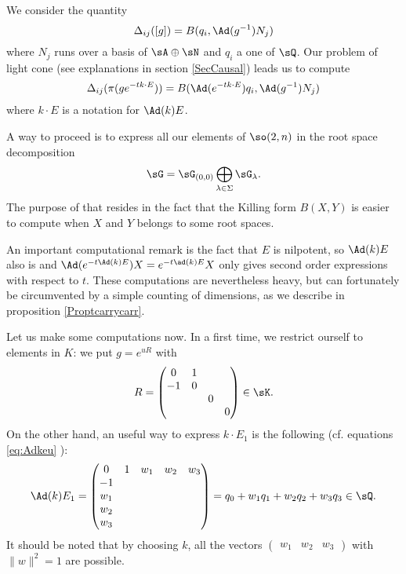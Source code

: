 We consider the quantity 
\[
\Delta_{ij}([g])=B(q_i,\Ad(g^{-1})N_j)
\]
where $N_j$ runs over a basis of $\sA\oplus\sN$ and $q_i$ a one of $\sQ$. Our problem of light cone (see explanations in section \ref{SecCausal}) leads us to compute
 \begin{equation} \label{eq:elemtr}
\Delta_{ij}(\pi(ge^{-tk\cdot E}))=B(\Ad(e^{-tk\cdot
E})q_i,\Ad(g^{-1})N_j)
\end{equation}
where $k\cdot E$ is a notation for $\Ad(k)E$.

A way to proceed is  to express all our elements of $\so(2,n)$ in the root space decomposition
\[
\sG=\sG_{(0,0)}\bigoplus_{\lambda\in\Sigma}\sG_{\lambda}.
\]
The purpose of that resides in the fact that the Killing form $B(X,Y)$ is easier to compute when $X$ and $Y$ belongs to some root spaces.

An important computational remark is the fact that $E$ is nilpotent, so $\Ad(k)E$ also is and $\Ad(e^{-t\Ad(k)E})X=e^{-t\ad(k)E}X$ only gives second order expressions with respect to $t$. These computations are nevertheless heavy, but can fortunately be circumvented by a simple counting of dimensions, as we describe in proposition \ref{Proptcarrycarr}.

Let us make some computations now. In a first time, we restrict ourself to elements in $K$: we put $g=e^{uR}$ with
\[
R=
\begin{pmatrix}
0&1\\
-1&0\\
&&0\\
&&&0
\end{pmatrix}\in\sK.
\]
On the other hand, an useful way to express $k\cdot E_1$ is the following (cf. equations \eqref{eq:Adkeu} ):
\[
\Ad(k)E_1=
\begin{pmatrix}
0&1&w_1&w_2&w_3\\
-1\\
w_1\\
w_2\\
w_3
\end{pmatrix}
=q_0+w_1q_1+w_2q_2+w_3q_3\in \sQ.
\]
It should be noted that by choosing $k$, all the vectors $\begin{pmatrix}w_1&w_2&w_3\end{pmatrix}$ with $\|w\|^2=1$ are possible.

